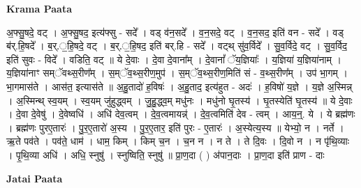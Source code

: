 \documentclass[17pt]{extarticle}
\begin{document}
\textbf{Krama Paata} \newline

अ॒फ्सु॒षदे॒ वट् । अ॒फ्सु॒षद॒ इत्य॑फ्सु - सदे᳚ । वड् व॑न॒सदे᳚ । व॒न॒सदे॒ वट् । व॒न॒सद॒ इति॑ वन - सदे᳚ । वड् ब॑र्.हि॒षदे᳚ । ब॒र्.॒हि॒षदे॒ वट् । ब॒र्.॒हि॒षद॒ इति॑ बर्.हि - सदे᳚ । वट्थ् सु॑व॒र्विदे᳚ । सु॒व॒र्विदे॒ वट् । सु॒व॒र्विद॒ इति॑ सुवः - विदे᳚ । वडिति॒ वट् ॥ ये दे॒वाः । दे॒वा दे॒वाना᳚म् । दे॒वानां᳚ ॅय॒ज्ञियाः᳚ । य॒ज्ञिया॑ य॒ज्ञिया॑नाम् । य॒ज्ञिया॑नाꣳ सम्ॅवथ्स॒रीण᳚म् । स॒म्ॅव॒थ्स॒रीण॒मुप॑ । स॒म्ॅव॒थ्स॒रीण॒मिति॑ सं - व॒थ्स॒रीण᳚म् । उप॑ भा॒गम् । भा॒गमास॑ते । आस॑त॒ इत्यास॑ते ॥ अ॒हु॒तादो॑ ह॒विषः॑ । अ॒हु॒ताद॒ इत्य॑हुत - अदः॑ । ह॒विषो॑ य॒ज्ञे । य॒ज्ञे अ॒स्मिन्न् । अ॒स्मिन्थ् स्व॒यम् । स्व॒यम् जु॑हुद्ध्वम् । जु॒हु॒द्ध्व॒म् मधु॑नः । मधु॑नो घृ॒तस्य॑ । घृ॒तस्येति॑ घृ॒तस्य॑ ॥ ये दे॒वाः । दे॒वा दे॒वेषु॑ । दे॒वेष्वधि॑ । अधि॑ देव॒त्वम् । दे॒व॒त्वमायन्न्॑ । दे॒व॒त्वमिति॑ देव - त्वम् । आय॒न्॒. ये । ये ब्रह्म॑णः । ब्रह्म॑णः पुरए॒तारः॑ । पु॒र॒ए॒तारो॑ अ॒स्य । पु॒र॒ए॒तार॒ इति॑ पुरः - ए॒तारः॑ । अ॒स्येत्य॒स्य ॥ येभ्यो॒ न । नर्ते । ऋ॒ते पव॑ते । पव॑ते॒ धाम॑ । धाम॒ किम् । किम् च॒न । च॒न न । न ते । ते दि॒वः । दि॒वो न । न पृ॑थि॒व्याः । पृ॒थि॒व्या अधि॑ । अधि॒ स्नुषु॑ । स्नुष्विति॒ स्नुषु॑ ॥ प्रा॒ण॒दा ( ) अ॑पान॒दाः । प्रा॒ण॒दा इति॑ प्राण - दाः \newline

\textbf{Jatai Paata} \newline
\end{document}
